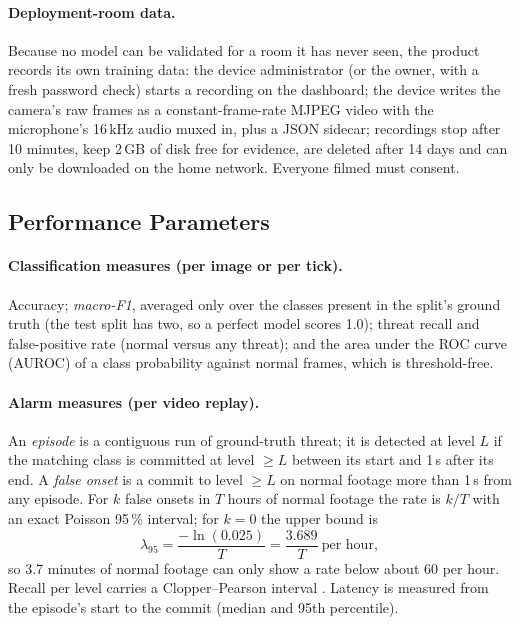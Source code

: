 \paragraph{Deployment-room data.} Because no model can be validated for a room it has never seen, the product records its own training data: the device administrator (or the owner, with a fresh password check) starts a recording on the dashboard; the device writes the camera's raw frames as a constant-frame-rate MJPEG video with the microphone's 16\,kHz audio muxed in, plus a JSON sidecar; recordings stop after 10 minutes, keep 2\,GB of disk free for evidence, are deleted after 14 days and can only be downloaded on the home network. Everyone filmed must consent.

\subsection{Performance Parameters}
\label{sec:perf-params}
\paragraph{Classification measures (per image or per tick).} Accuracy; \emph{macro-F1}, averaged only over the classes present in the split's ground truth (the test split has two, so a perfect model scores 1.0); threat recall and false-positive rate (normal versus any threat); and the area under the ROC curve (AUROC) \cite{fawcett2006roc} of a class probability against normal frames, which is threshold-free.

\paragraph{Alarm measures (per video replay).} An \emph{episode} is a contiguous run of ground-truth threat; it is detected at level $L$ if the matching class is committed at level $\geq L$ between its start and 1\,s after its end. A \emph{false onset} is a commit to level $\geq L$ on normal footage more than 1\,s from any episode. For $k$ false onsets in $T$ hours of normal footage the rate is $k/T$ with an exact Poisson 95\,\% interval; for $k=0$ the upper bound is
\begin{equation}
\lambda_{95} = \frac{-\ln(0.025)}{T} = \frac{3.689}{T}\ \text{per hour},
\end{equation}
so 3.7 minutes of normal footage can only show a rate below about 60 per hour. Recall per level carries a Clopper--Pearson interval \cite{clopper1934}. Latency is measured from the episode's start to the commit (median and 95th percentile).

